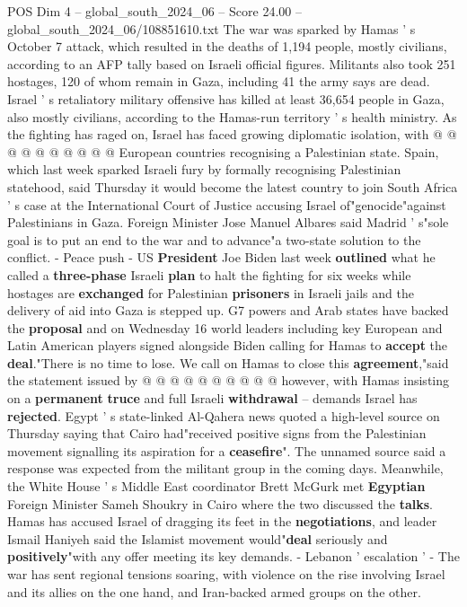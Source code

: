 \begin{textsample}{POS Dim 4 – global\_south\_2024\_06 – Score 24.00 – global\_south\_2024\_06/108851610.txt}
The war was sparked by Hamas ' s October 7 attack, which resulted in the deaths of 1,194 people, mostly civilians, according to an AFP tally based on Israeli official figures.
Militants also took 251 hostages, 120 of whom remain in Gaza, including 41 the army says are dead.
Israel ' s retaliatory military offensive has killed at least 36,654 people in Gaza, also mostly civilians, according to the Hamas-run territory ' s health ministry.
As the fighting has raged on, Israel has faced growing diplomatic isolation, with @ @ @ @ @ @ @ @ @ @ European countries recognising a Palestinian state.
Spain, which last week sparked Israeli fury by formally recognising Palestinian statehood, said Thursday it would become the latest country to join South Africa ' s case at the International Court of Justice accusing Israel of"genocide"against Palestinians in Gaza.
Foreign Minister Jose Manuel Albares said Madrid ' s"sole goal is to put an end to the war and to advance"a two-state solution to the conflict. - Peace push - US \textbf{President} Joe Biden last week \textbf{outlined} what he called a \textbf{three-phase} Israeli \textbf{plan} to halt the fighting for six weeks while hostages are \textbf{exchanged} for Palestinian \textbf{prisoners} in Israeli jails and the delivery of aid into Gaza is stepped up.
G7 powers and Arab states have backed the \textbf{proposal} and on Wednesday 16 world leaders including key European and Latin American players signed alongside Biden calling for Hamas to \textbf{accept} the \textbf{deal}."There is no time to lose.
We call on Hamas to close this \textbf{agreement},"said the statement issued by @ @ @ @ @ @ @ @ @ @ however, with Hamas insisting on a \textbf{permanent} \textbf{truce} and full Israeli \textbf{withdrawal} -- demands Israel has \textbf{rejected}.
Egypt ' s state-linked Al-Qahera news quoted a high-level source on Thursday saying that Cairo had"received positive signs from the Palestinian movement signalling its aspiration for a \textbf{ceasefire}".
The unnamed source said a response was expected from the militant group in the coming days.
Meanwhile, the White House ' s Middle East coordinator Brett McGurk met \textbf{Egyptian} Foreign Minister Sameh Shoukry in Cairo where the two discussed the \textbf{talks}.
Hamas has accused Israel of dragging its feet in the \textbf{negotiations}, and leader Ismail Haniyeh said the Islamist movement would"\textbf{deal} seriously and \textbf{positively}"with any offer meeting its key demands. - Lebanon ' escalation ' - The war has sent regional tensions soaring, with violence on the rise involving Israel and its allies on the one hand, and Iran-backed armed groups on the other.

\end{textsample}
